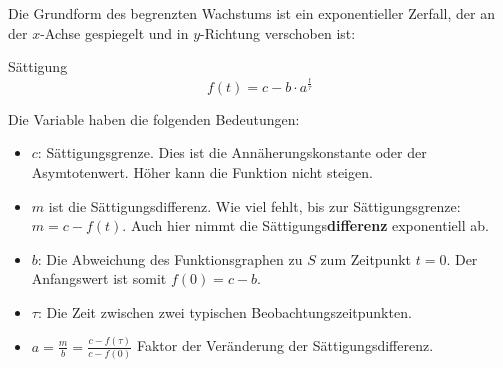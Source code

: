 \begin{center}
\end{center}

Die Grundform des begrenzten Wachstums ist ein exponentieller Zerfall,
der an der $x$-Achse gespiegelt und in $y$-Richtung
verschoben ist:

\begin{definition}{Sättigung}{}
$$f(t) =c - b\cdot{} a^{\frac{t}{\tau}}$$
\end{definition}

Die Variable haben die folgenden Bedeutungen:

\begin{itemize}
	\item $c$: Sättigungsgrenze. Dies ist die Annäherungskonstante oder der Asymtotenwert. Höher kann die Funktion nicht steigen.

	\item $m$ ist die
    Sättigungsdifferenz. Wie viel fehlt, bis zur
    Sättigungsgrenze: $m = c - f(t)$. Auch hier nimmt die Sättigungs\textbf{differenz} exponentiell ab.
	\item $b$: Die Abweichung des Funktionsgraphen zu $S$ zum Zeitpunkt $t=0$. Der
    Anfangswert ist somit $f(0) = c - b$.
	\item $\tau$: Die Zeit zwischen zwei typischen
    Beobachtungszeitpunkten.
\item $a=\frac{m}{b}=\frac{c-f(\tau)}{c-f(0)}$ Faktor der Veränderung
  der Sättigungsdifferenz.
\end{itemize}



